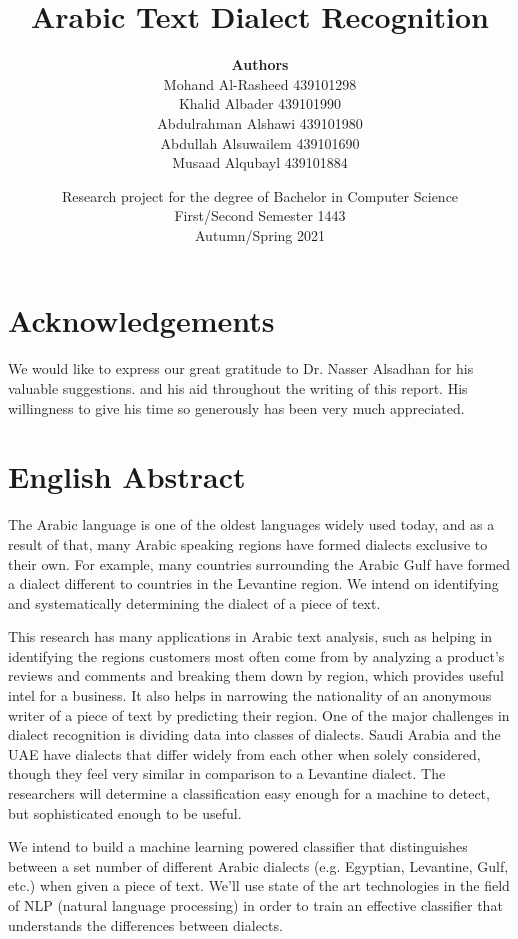 \documentclass[12pt]{diazessay}
\title{\textbf{Arabic Text Dialect Recognition}}
\author{\textbf{Authors} \\ 
Mohand Al-Rasheed \hspace{15pt} 439101298\\
Khalid Albader \hspace{50pt}  439101990\\
Abdulrahman Alshawi \hspace{4pt}  439101980\\
Abdullah Alsuwailem \hspace{11pt}  439101690\\
Musaad Alqubayl \hspace{35pt}  439101884\\
}
\date{Research project for the degree of Bachelor in Computer Science \\
First/Second Semester 1443 \\
Autumn/Spring 2021}
\begin{document}
\maketitle 



\tableofcontents

\cleardoublepage

\section*{Acknowledgements}
We would like to express our great gratitude to Dr. Nasser Alsadhan for his valuable suggestions. and his aid throughout the writing of this report. His willingness to give his time so generously has been very much appreciated.

\section*{English Abstract}
The Arabic language is one of the oldest languages widely used today, and as a result of that, many Arabic speaking regions have formed dialects exclusive to their own. For example, many countries surrounding the Arabic Gulf have formed a dialect different to countries in the Levantine region. We intend on identifying and systematically determining the dialect of a piece of text. 

 This research has many applications in Arabic text analysis, such as helping in identifying the regions customers most often come from by analyzing a product’s reviews and comments and breaking them down by region, which provides useful intel for a business. It also helps in narrowing the nationality of an anonymous writer of a piece of text by predicting their region.
One of the major challenges in dialect recognition is dividing data into classes of dialects. Saudi Arabia and the UAE have dialects that differ widely from each other when solely considered, though they feel very similar in comparison to a Levantine dialect. The researchers will determine a classification easy enough for a machine to detect, but sophisticated enough to be useful. 

We intend to build a machine learning powered classifier that distinguishes between a set number of different Arabic dialects (e.g. Egyptian, Levantine, Gulf, etc.) when given a piece of text. We’ll use state of the art technologies in the field of NLP (natural language processing) in order to train an effective classifier that understands the differences between dialects.
\end{document}
